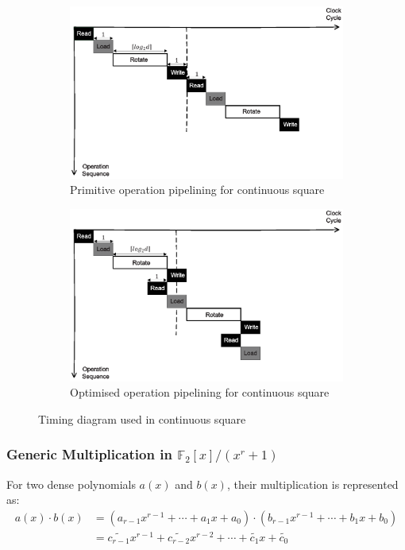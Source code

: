\documentclass[runningheads]{llncs}
\begin{document}
\begin{figure}[!tb]
\centering
\begin{subfigure}[t]{0.45\textwidth}\centering
\includegraphics[width=\textwidth]{./fig/pipeline_square.eps}
\caption{Primitive operation pipelining for continuous square}
\label{fig:pipeline_squ}
\end{subfigure}
\hspace{1em}
\begin{subfigure}[t]{0.45\textwidth}\centering
\includegraphics[width=\textwidth]{./fig/pipeline_square2.eps}
\caption{Optimised operation pipelining for continuous square }
\label{fig:pipeline_squ2}
\end{subfigure}
\caption{Timing diagram used in continuous square}
\end{figure}


\subsubsection{Generic Multiplication in $\mathbb{F}_2[x]/(x^r+1)$}
For two dense polynomials $a(x)$ and $b(x)$, their multiplication is represented as:
\begin{align}
    a(x)\cdot b(x) &= (a_{r-1}x^{r-1}+\cdots + a_{1}x + a_0)\cdot(b_{r-1}x^{r-1}+\cdots + b_{1}x + b_0)\\
    &= \widetilde{c_{r-1}}x^{r-1}+\widetilde{c_{r-2}}x^{r-2}+\cdots + \widetilde{c_{1}}x +\widetilde{c_0}
\end{align}
\end{document}
